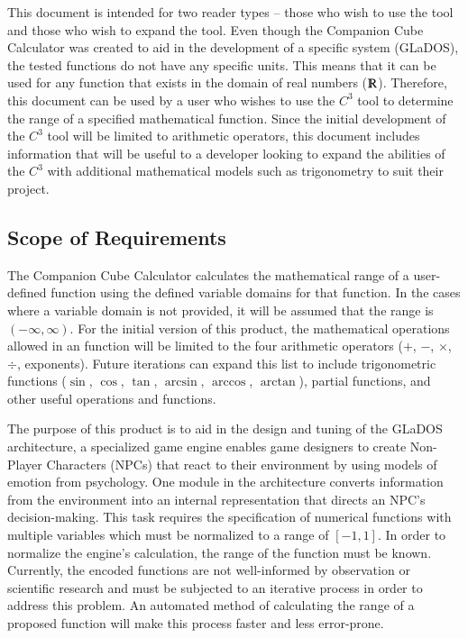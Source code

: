 \documentclass[12pt]{article}
\newcommand{\progname}{Companion Cube Calculator} %
\newcommand{\prognameAbbrv}{$C^{3}$}
\begin{document}
This document is intended for two reader types -- those who wish to use the 
tool and those who wish to expand the tool. Even though the \progname{} was 
created to aid in the development of a specific system (GLaDOS), the tested 
functions do not have any specific units. This means that it can be used for 
any function that exists in the domain of real numbers ($\varmathbb{R}$). 
Therefore, this document can be used by a user who wishes to use the 
\prognameAbbrv{} tool to determine the range of a specified mathematical 
function. Since the initial development of the \prognameAbbrv{} tool will be 
limited to arithmetic operators, this document includes information that will 
be useful to a developer looking to expand the abilities of the 
\prognameAbbrv{} with additional mathematical models such as trigonometry to 
suit their project.

\subsection{Scope of Requirements} 
The \progname{} calculates the mathematical range of a user-defined function 
using the defined variable domains for that function. In the cases where a 
variable domain is not provided, it will be assumed that the range is 
$(-\infty, \infty)$. For the initial version of this product, the mathematical 
operations allowed in an function will be limited to the four arithmetic 
operators ($+$, $-$, $\times$, $\div$, exponents). Future iterations can expand 
this list to include trigonometric functions ($\sin$, $\cos$, $\tan$, $\arcsin$,
$\arccos$, $\arctan$), partial functions, and other useful operations and 
functions.

The purpose of this product is to aid in the design and tuning of the GLaDOS 
architecture, a specialized game engine enables game designers to create 
Non-Player Characters (NPCs) that react to their environment by using models of 
emotion from psychology. One module in the architecture converts information 
from the environment into an internal representation that directs an NPC's 
decision-making. This task requires the specification of numerical functions 
with multiple variables which must be normalized to a range of $[-1,1]$. In 
order to normalize the engine's calculation, the range of the function must be 
known. Currently, the encoded functions are not well-informed by observation or 
scientific research and must be subjected to an iterative process in order to 
address this problem. An automated method of calculating the range of a 
proposed function will make this process faster and less error-prone.
\end{document}
